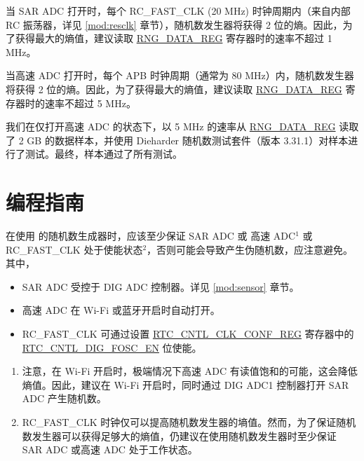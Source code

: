 \documentclass[main\_\_CN.tex]{subfiles}
\begin{document}
当 SAR ADC 打开时，每个 RC\_FAST\_CLK (20 MHz) 时钟周期内（来自内部 RC 振荡器，详见 \ref{mod:resclk} \textit{} 章节），随机数发生器将获得 2 位的熵。因此，为了获得最大的熵值，建议读取 \hyperref[regdesc:RNGDATAREG]{RNG\_DATA\_REG} 寄存器时的速率不超过 1 MHz。

当高速 ADC 打开时，每个 APB 时钟周期（通常为 80 MHz）内，随机数发生器将获得 2 位的熵。因此，为了获得最大的熵值，建议读取 \hyperref[regdesc:RNGDATAREG]{RNG\_DATA\_REG} 寄存器时的速率不超过 5 MHz。

我们在仅打开高速 ADC 的状态下，以 5 MHz 的速率从 \hyperref[regdesc:RNGDATAREG]{RNG\_DATA\_REG} 读取了 2 GB 的数据样本，并使用 Dieharder 随机数测试套件（版本 3.31.1）对样本进行了测试。最终，样本通过了所有测试。


\section{编程指南}

在使用 \chipname{} 的随机数生成器时，应该至少保证 SAR ADC 或 高速 ADC\hyperref[others:rng-note-clock-seed]{$^1$} 或 RC\_FAST\_CLK 处于使能状态\hyperref[others:rng-note-clock-seed]{$^2$}，否则可能会导致产生伪随机数，应注意避免。其中，
\begin{itemize}
    \item SAR ADC 受控于 DIG ADC 控制器。详见 \ref{mod:sensor} \textit{} 章节。
    \item 高速 ADC 在 Wi-Fi 或蓝牙开启时自动打开。
    \item RC\_FAST\_CLK 可通过设置 \hyperref[regdesc:RTCCNTLCLKCONFREG]{RTC\_CNTL\_CLK\_CONF\_REG} 寄存器中的 \hyperref[fielddesc:RTCCNTLDIGFOSCEN]{RTC\_CNTL\_DIG\_FOSC\_EN} 位使能。
\end{itemize}
\begin{tiplisting}
\vspace{-2.5em}
\begin{enumerate}
    \label{others:rng-note-clock-seed}
    \item 注意，在 Wi-Fi 开启时，极端情况下高速 ADC 有读值饱和的可能，这会降低熵值。因此，建议在 Wi-Fi 开启时，同时通过 DIG ADC1 控制器打开 SAR ADC 产生随机数。
    \item RC\_FAST\_CLK 时钟仅可以提高随机数发生器的墒值。然而，为了保证随机数发生器可以获得足够大的熵值，仍建议在使用随机数发生器时至少保证 SAR ADC 或高速 ADC 处于工作状态。
\end{enumerate}
\end{tiplisting}
\end{document}
